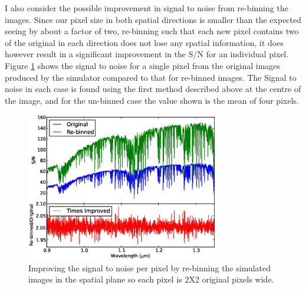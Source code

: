 \documentclass[11pt,twoside]{article}
\begin{document}
I also consider the possible improvement in signal to noise from re-binning the images. Since our pixel size in both spatial directions is smaller than the expected seeing by about a factor of two, re-binning such that each new pixel contains two of the original in each direction does not lose any spatial information, it does however result in a significant improvement in the S/N for an individual pixel. Figure \ref{bin} shows the signal to noise for a single pixel from the original images produced by the simulator compared to that for re-binned images. The Signal to noise in each case is found using the first method described above at the centre of the image, and for the un-binned case the value shown is the mean of four pixels.

\begin{figure}[htp]
\centering
\includegraphics[width=0.75\textwidth]{SN_rebin}
\caption{Improving the signal to noise per pixel by re-binning the simulated images in the spatial plane so each pixel is 2X2 original pixels wide.}
\label{bin}
\end{figure}
\end{document}
